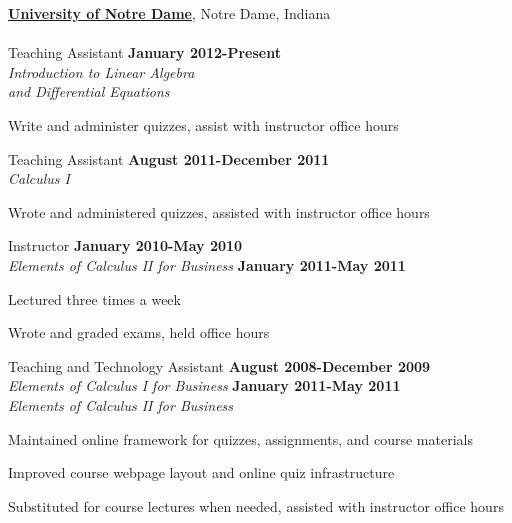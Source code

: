 \documentclass[11pt,oneside]{amsart}
\renewcommand{\section}[2]%
{\vspace{0.7cm}%
\hspace{0in}%
\marginpar{\scshape #1}#2}
\begin{document}
\section{Teaching \\ Experience}
\href{http://nd.edu/}{\textbf{University of Notre Dame}}, 
Notre Dame, Indiana
\\
\\
Teaching Assistant \hfill \textbf{January 2012-Present}
\\
\textit{Introduction to Linear Algebra \\ and Differential Equations} 
\\
\begin{compactitem}
\item Write and administer quizzes, assist with instructor office hours 
\end{compactitem}
\vspace{0.4cm}
Teaching Assistant \hfill \textbf{August 2011-December 2011}
\\
\textit{Calculus I} 
\\
\begin{compactitem}
\item Wrote and administered quizzes, assisted with instructor office hours 
\end{compactitem}
\vspace{0.4cm}
Instructor \hfill \textbf{January 2010-May 2010}\\ \textit{Elements of
Calculus II for Business} \hfill \textbf{January 2011-May 2011}
%
\\
\begin{compactitem}
\item Lectured three times a week
\item Wrote and graded exams, held office hours 
\end{compactitem}
\vspace{0.4cm}
Teaching and Technology Assistant \hfill \textbf{August 2008-December 2009}
\\
\textit{Elements of Calculus I for Business} \hfill \textbf{January 2011-May 2011}
\\
\textit{Elements of Calculus II 
for Business} 
\\
\begin{compactitem}
\item Maintained online framework for quizzes, assignments, 
and course materials
\item Improved course webpage layout and online quiz infrastructure
\item Substituted for course lectures when needed, assisted with instructor office hours 
\end{compactitem}
\end{document}
